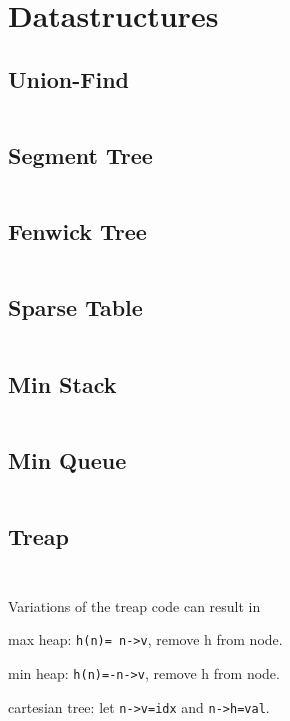 \documentclass[11pt, a4paper]{amsart}
\newenvironment{itemize_compact}
{ \begin{itemize}[leftmargin=.5cm]
    \setlength{\itemsep}{0pt}
    \setlength{\parskip}{0pt}
    \setlength{\parsep}{0pt}     }
{ \end{itemize}                  }
\begin{document}
	\newpage
	\section{Datastructures}
	\begin{multicols*}{2}		
		\subsection{Union-Find}
		\inputminted[firstline=9,lastline=19]{c++}{.code/datastructures/union_find.cpp}
		\subsection{Segment Tree}
		\inputminted[firstline=14,lastline=52]{c++}{.code/datastructures/segment_tree.cpp}
		\vfill\null
		\columnbreak
		\subsection{Fenwick Tree}
		\inputminted[firstline=14,lastline=32]{c++}{.code/datastructures/fenwick_tree.cpp}
		\subsection{Sparse Table}
		\inputminted[firstline=15,lastline=23]{c++}{.code/datastructures/sparse_table.cpp}
		\subsection{Min Stack}
		\inputminted[firstline=15,lastline=22]{c++}{.code/datastructures/min_queue.cpp}
		\subsection{Min Queue}
		\inputminted[firstline=23,lastline=31]{c++}{.code/datastructures/min_queue.cpp}
		\vfill\null
	\end{multicols*}
	\begin{multicols*}{2}
		\subsection{Treap}
		\inputminted[firstline=16,lastline=67]{c++}{.code/datastructures/treap.cpp}
		\vfill\null
		\columnbreak
		\inputminted[firstline=68,lastline=115]{c++}{.code/datastructures/treap.cpp}
		\noindent
		Variations of the treap code can result in
		\begin{itemize_compact}
			\item max heap: \texttt{h(n)= n->v}, remove h from node.
			\item min heap: \texttt{h(n)=-n->v}, remove h from node.
			\item cartesian tree: let \texttt{n->v=idx} and \texttt{n->h=val}.
		\end{itemize_compact}
		\vfill\null
	\end{multicols*}
\end{document}
